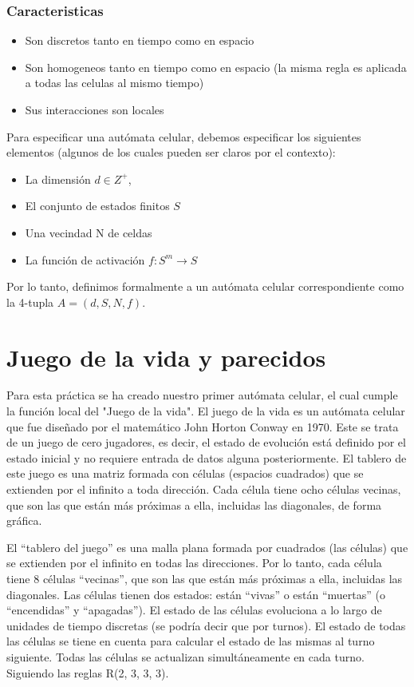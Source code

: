 \documentclass[12pt, fleqn]{report}                             %
\theoremstyle{break}                                            %
\begin{document}
      \subsection{Caracteristicas}
      \begin{itemize}
        \item Son discretos tanto en tiempo como en espacio
        \item Son homogeneos tanto en tiempo como en espacio 
        (la misma regla es aplicada a todas las celulas al mismo tiempo)
        \item Sus interacciones son locales
      \end{itemize}

      Para especificar una autómata celular, debemos especificar los siguientes 
      elementos (algunos de los cuales pueden ser claros por el contexto):
      \begin{itemize}
        \item La dimensión $d \in Z^+$,
        \item El conjunto de estados finitos $S$
        \item Una vecindad N de celdas
        \item La función de activación $f: S^m \to S$
      \end{itemize}

      Por lo tanto, definimos formalmente a un autómata celular 
      correspondiente como la 4-tupla $A = (d, S, N, f)$.

  \chapter{Juego de la vida y parecidos}

    Para esta práctica se ha creado nuestro primer autómata celular, el cual cumple la
    función local del "Juego de la vida". El juego de la vida es un autómata celular
    que fue diseñado por el matemático John Horton Conway en 1970. Este se trata
    de un juego de cero jugadores, es decir, el estado de evolución está definido por el
    estado inicial y no requiere entrada de datos alguna posteriormente. El tablero de
    este juego es una matriz formada con células (espacios cuadrados) que se extienden
    por el infinito a toda dirección. Cada célula tiene ocho células vecinas, que son las
    que están más próximas a ella, incluidas las diagonales, de forma gráfica.
    
    El “tablero del juego” es una malla plana formada por cuadrados
    (las células) que se extienden por el infinito en todas las direcciones. Por
    lo tanto, cada célula tiene 8 células “vecinas”, que son las que están más
    próximas a ella, incluidas las diagonales. Las células tienen dos estados: están
    “vivas” o están “muertas” (o “encendidas” y “apagadas”). El estado de las
    células evoluciona a lo largo de unidades de tiempo discretas (se podría decir
    que por turnos). El estado de todas las células se tiene en cuenta para calcular
    el estado de las mismas al turno siguiente. Todas las células se actualizan
    simultáneamente en cada turno. Siguiendo las reglas R(2, 3, 3, 3).
    
\end{document}
